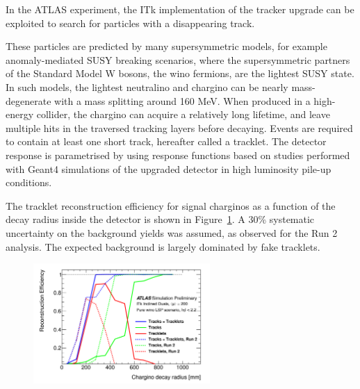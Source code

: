 In the ATLAS experiment, the ITk implementation of the tracker upgrade can be exploited to search for particles with a disappearing track.

These particles are predicted by many supersymmetric models, for example anomaly-mediated SUSY breaking scenarios, where the supersymmetric partners of the Standard Model W bosons, the wino fermions, are the lightest SUSY state. In such models, the lightest neutralino and chargino can be nearly mass-degenerate with a mass splitting around 160 MeV. When produced in a high-energy collider, the chargino can acquire a relatively long lifetime, and leave
multiple hits in the traversed tracking layers before decaying. 
Events are required to contain at least one short track, hereafter called a tracklet. 
The detector response is parametrised by using response functions based on studies performed with Geant4 simulations of
the upgraded detector in high luminosity pile-up conditions.

The tracklet reconstruction efficiency for signal charginos as a function of the decay radius inside the detector is shown in Figure~\ref{fig:ATLAS_DT1}.
A 30\% systematic uncertainty on the background yields was assumed, as observed for the Run 2 analysis. The expected background is largely dominated by fake tracklets.
%
\begin{figure}[t]\begin{center}
\includegraphics[width=0.6\textwidth]{figures/ch03_fig_039.png}
\caption{ }
\label{fig:ATLAS_DT1}
\end{center}
\end{figure}


